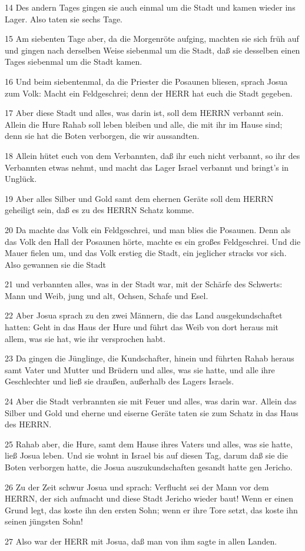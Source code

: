 \par 14 Des andern Tages gingen sie auch einmal um die Stadt und kamen wieder ins Lager. Also taten sie sechs Tage.
\par 15 Am siebenten Tage aber, da die Morgenröte aufging, machten sie sich früh auf und gingen nach derselben Weise siebenmal um die Stadt, daß sie desselben einen Tages siebenmal um die Stadt kamen.
\par 16 Und beim siebentenmal, da die Priester die Posaunen bliesen, sprach Josua zum Volk: Macht ein Feldgeschrei; denn der HERR hat euch die Stadt gegeben.
\par 17 Aber diese Stadt und alles, was darin ist, soll dem HERRN verbannt sein. Allein die Hure Rahab soll leben bleiben und alle, die mit ihr im Hause sind; denn sie hat die Boten verborgen, die wir aussandten.
\par 18 Allein hütet euch von dem Verbannten, daß ihr euch nicht verbannt, so ihr des Verbannten etwas nehmt, und macht das Lager Israel verbannt und bringt's in Unglück.
\par 19 Aber alles Silber und Gold samt dem ehernen Geräte soll dem HERRN geheiligt sein, daß es zu des HERRN Schatz komme.
\par 20 Da machte das Volk ein Feldgeschrei, und man blies die Posaunen. Denn als das Volk den Hall der Posaunen hörte, machte es ein großes Feldgeschrei. Und die Mauer fielen um, und das Volk erstieg die Stadt, ein jeglicher stracks vor sich. Also gewannen sie die Stadt
\par 21 und verbannten alles, was in der Stadt war, mit der Schärfe des Schwerts: Mann und Weib, jung und alt, Ochsen, Schafe und Esel.
\par 22 Aber Josua sprach zu den zwei Männern, die das Land ausgekundschaftet hatten: Geht in das Haus der Hure und führt das Weib von dort heraus mit allem, was sie hat, wie ihr versprochen habt.
\par 23 Da gingen die Jünglinge, die Kundschafter, hinein und führten Rahab heraus samt Vater und Mutter und Brüdern und alles, was sie hatte, und alle ihre Geschlechter und ließ sie draußen, außerhalb des Lagers Israels.
\par 24 Aber die Stadt verbrannten sie mit Feuer und alles, was darin war. Allein das Silber und Gold und eherne und eiserne Geräte taten sie zum Schatz in das Haus des HERRN.
\par 25 Rahab aber, die Hure, samt dem Hause ihres Vaters und alles, was sie hatte, ließ Josua leben. Und sie wohnt in Israel bis auf diesen Tag, darum daß sie die Boten verborgen hatte, die Josua auszukundschaften gesandt hatte gen Jericho.
\par 26 Zu der Zeit schwur Josua und sprach: Verflucht sei der Mann vor dem HERRN, der sich aufmacht und diese Stadt Jericho wieder baut! Wenn er einen Grund legt, das koste ihn den ersten Sohn; wenn er ihre Tore setzt, das koste ihn seinen jüngsten Sohn!
\par 27 Also war der HERR mit Josua, daß man von ihm sagte in allen Landen.


